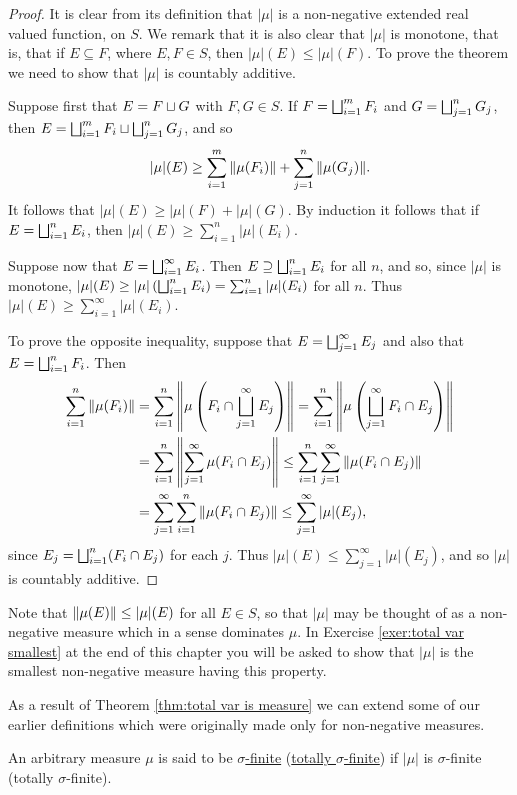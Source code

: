 \begin{proof}
It is clear from its definition that $|\mu|$ is a non-negative extended real valued function, on $S$. We remark that it is also clear that $|\mu|$ is monotone, that is, that if $E \subseteq F$, where $E, F\in S$, then $|\mu|(E)\leq|\mu|(F)$. To prove the theorem we need to show that $|\mu|$ is countably additive.

Suppose first that $E=F\sqcup G$ with $F,G\in S$. If $F=\bigsqcup_{i=1}^mF_i$ and $G=\bigsqcup_{j=1}^nG_j$, then $E=\bigsqcup_{i=1}^mF_i\sqcup\bigsqcup_{j=1}^nG_j$, and so $$|\mu|(E)\geq\sum_{i=1}^m\norm{\mu(F_i)}+\sum_{j=1}^n\norm{\mu(G_j)}.$$ It follows that $|\mu|(E)\geq|\mu|(F)+|\mu|(G)$. By induction it follows that if $E=\bigsqcup_{i=1}^nE_i$, then $|\mu|(E)\geq\sum_{i=1}^n|\mu|(E_i)$.

Suppose now that $E=\bigsqcup_{i=1}^\infty E_i$. Then $E\supseteq\bigsqcup_{i=1}^nE_i$ for all $n$, and so, since $|\mu|$ is monotone, $|\mu|(E)\geq|\mu|\left(\bigsqcup_{i=1}^nE_i\right)=\sum_{i=1}^n|\mu|(E_i)$ for all $n$. Thus $|\mu|(E)\geq\sum_{i=1}^\infty|\mu|(E_i)$.

To prove the opposite inequality, suppose that $E=\bigsqcup_{j=1}^\infty E_j$ and also that $E=\bigsqcup_{i=1}^nF_i$. Then
\begin{align*}
    \sum_{i=1}^n\norm{\mu(F_i)}&=\sum_{i=1}^n\norm{\mu\left(F_i\cap\bigsqcup_{j=1}^\infty E_j\right)}=\sum_{i=1}^n\norm{\mu\left(\bigsqcup_{j=1}^\infty F_i\cap E_j\right)}\\
    &=\sum_{i=1}^n\norm{\sum_{j=1}^\infty\mu(F_i\cap E_j)}\leq\sum_{i=1}^n\sum_{j=1}^\infty\norm{\mu(F_i\cap E_j)}\\
    &=\sum_{j=1}^\infty\sum_{i=1}^n\norm{\mu(F_i\cap E_j)}\leq\sum_{j=1}^\infty|\mu|(E_j),
\end{align*}
since $E_j=\bigsqcup_{i=1}^n(F_i\cap E_j)$ for each $j$. Thus $|\mu|(E)\leq\sum_{j=1}^\infty|\mu|(E_j)$, and so $|\mu|$ is countably additive.
\end{proof}

Note that $\norm{\mu(E)}\leq|\mu|(E)$ for all $E \in S$, so that $|\mu|$ may be thought of as a non-negative measure which in a sense dominates $\mu$. In Exercise \ref{exer:total var smallest} at the end of this chapter you will be asked to show that $|\mu|$ is the smallest non-negative measure having this property.

As a result of Theorem \ref{thm:total var is measure} we can extend some of our earlier definitions which were originally made only for non-negative measures.

\begin{definition}
An arbitrary measure $\mu$ is said to be \underline{$\sigma$-finite} (\underline{totally $\sigma$-finite}) if $|\mu|$ is $\sigma$-finite (totally $\sigma$-finite).
\end{definition}

